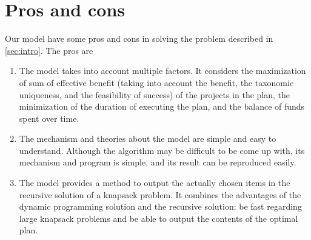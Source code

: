 \documentclass{article}
\begin{document}

\section{Pros and cons}
Our model have some pros and cons in solving the problem described in \ref{sec:intro}.
The pros are
\begin{enumerate}
\item The model takes into account multiple factors.
It considers the maximization of sum of effective benefit
(taking into account the benefit, the taxonomic uniqueness, and the feasibility of success)
of the projects in the plan,
the minimization of the duration of executing the plan,
and the balance of funds spent over time.
\item The mechanism and theories about the model are simple and easy to understand.
Although the algorithm may be difficult to be come up with,
its mechanism and program is simple, and its result can be reproduced easily.
\item The model provides a method to output the actually chosen items in the recursive solution of a knapsack problem.
It combines the advantages of the dynamic programming solution and the recursive solution: be fast regarding large knapsack problems and be able to output the contents of the optimal plan.
\end{enumerate}
\end{document}
